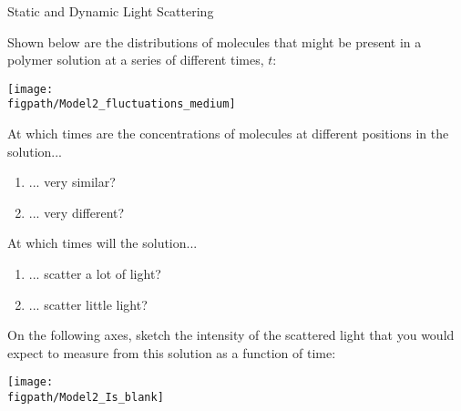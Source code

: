 \begin{activity}{Static and Dynamic Light Scattering}
\begin{model}
	Shown below are the distributions of molecules that might be present in a polymer solution at a series of different times, $t$:
	
	\vspace{6pt}
	\centerline{\texttt{[image: \\figpath/Model2\_fluctuations\_medium]}}
	
\end{model}

\begin{ctqs}

	\question At which times are the concentrations of molecules at different positions in the solution...
	
		\begin{enumerate}
			\item ... very similar?
			
				\begin{solution}[0.25in]{}
				\end{solution}
			
			\item ... very different?
			
				\begin{solution}[0.25in]{}
				\end{solution}
		\end{enumerate}
		
	\question At which times will the solution...
	
		\begin{enumerate}
			\item ... scatter a lot of light?
			
				\begin{solution}[0.25in]{}
				\end{solution}
			
			\item ... scatter little light?
			
				\begin{solution}[0.25in]{}
				\end{solution}
				
		\end{enumerate}
		
		\clearpage
	\question On the following axes, sketch the intensity of the scattered light that you would expect to measure from this solution as a function of time:
	
		\vspace{6pt}
		\centerline{\texttt{[image: \\figpath/Model2\_Is\_blank]}}
		\vspace{6pt}
		

\end{ctqs}
\end{activity}
